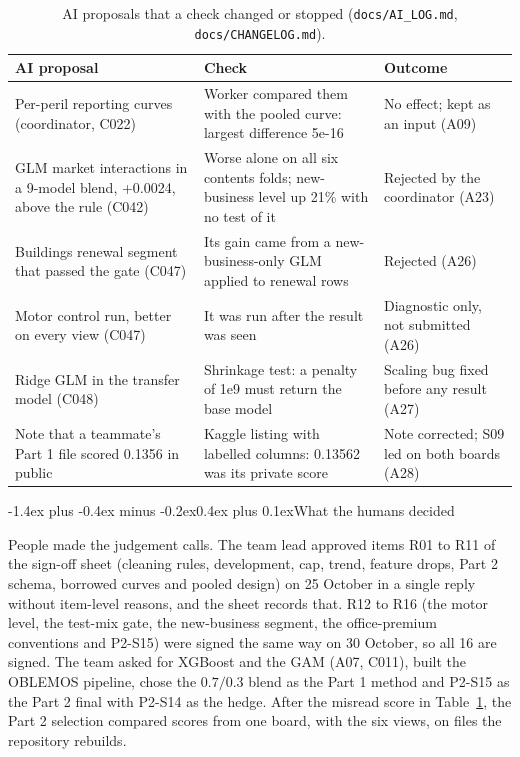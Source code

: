 \documentclass[11pt,a4paper]{article}
\makeatletter
\renewcommand\subsection{\@startsection{subsection}{2}{\z@}%
  {-1.4ex plus -0.4ex minus -0.2ex}{0.4ex plus 0.1ex}{\normalfont\normalsize\bfseries}}
\newcommand{\code}[1]{\texttt{#1}}
\makeatother
\begin{document}
\begin{table}[htbp]
\centering\small
\begin{tabularx}{\textwidth}{>{\raggedright\arraybackslash}p{4.6cm}>{\raggedright\arraybackslash}X>{\raggedright\arraybackslash}p{3.9cm}}
\toprule
AI proposal & Check & Outcome\\
\midrule
Per-peril reporting curves (coordinator, C022) & Worker compared them with the pooled curve: largest difference 5e-16 & No effect; kept as an input (A09)\\
GLM market interactions in a 9-model blend, +0.0024, above the rule (C042) & Worse alone on all six contents folds; new-business level up 21\% with no test of it & Rejected by the coordinator (A23)\\
Buildings renewal segment that passed the gate (C047) & Its gain came from a new-business-only GLM applied to renewal rows & Rejected (A26)\\
Motor control run, better on every view (C047) & It was run after the result was seen & Diagnostic only, not submitted (A26)\\
Ridge GLM in the transfer model (C048) & Shrinkage test: a penalty of 1e9 must return the base model & Scaling bug fixed before any result (A27)\\
Note that a teammate's Part 1 file scored 0.1356 in public & Kaggle listing with labelled columns: 0.13562 was its private score & Note corrected; S09 led on both boards (A28)\\
\bottomrule
\end{tabularx}
\caption{AI proposals that a check changed or stopped (\code{docs/AI\_LOG.md}, \code{docs/CHANGELOG.md}).}
\label{tab:ai}
\end{table}

\subsection{What the humans decided}

People made the judgement calls. The team lead approved items R01 to R11 of the sign-off sheet (cleaning rules,
development, cap, trend, feature drops, Part 2 schema, borrowed curves and pooled design) on 25 October in a single
reply without item-level reasons, and the sheet records that. R12 to R16 (the motor level, the test-mix gate, the
new-business segment, the office-premium conventions and P2-S15) were signed the same way on 30 October, so all 16 are
signed. The team asked for XGBoost and the GAM (A07, C011),
built the OBLEMOS pipeline, chose the $0.7/0.3$ blend as the Part 1 method and P2-S15 as the Part 2 final with P2-S14 as
the hedge. After the misread score in Table~\ref{tab:ai}, the Part 2 selection compared scores from one board, with
the six views, on files the repository rebuilds.
\end{document}
